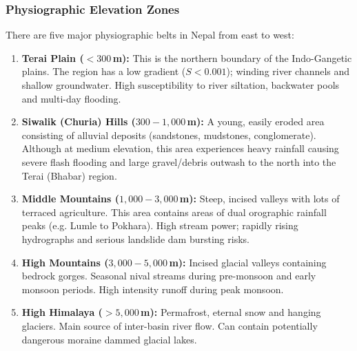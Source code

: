 \documentclass[journal]{IEEEtran}
\begin{document}
\subsubsection{Physiographic Elevation Zones}
There are five major physiographic belts in Nepal from east to west:
\begin{enumerate}
\item \textbf{Terai Plain ($<300$\,m):} This is the northern boundary of the Indo-Gangetic plains. The region has a low gradient ($S<0.001$); winding river channels and shallow groundwater. High susceptibility to river siltation, backwater pools and multi-day flooding.
\item \textbf{Siwalik (Churia) Hills ($300 - 1{,}000$\,m):} A young, easily eroded area consisting of alluvial deposits (sandstones, mudstones, conglomerate). Although at medium elevation, this area experiences heavy rainfall causing severe flash flooding and large gravel/debris outwash to the north into the Terai (Bhabar) region.
\item \textbf{Middle Mountains ($1{,}000 - 3{,}000$\,m):} Steep, incised valleys with lots of terraced agriculture. This area contains areas of dual orographic rainfall peaks (e.g. Lumle to Pokhara). High stream power; rapidly rising hydrographs and serious landslide dam bursting risks.
\item \textbf{High Mountains ($3{,}000 - 5{,}000$\,m):} Incised glacial valleys containing bedrock gorges. Seasonal nival streams during pre-monsoon and early monsoon periods. High intensity runoff during peak monsoon.
\item \textbf{High Himalaya ($>5{,}000$\,m):} Permafrost, eternal snow and hanging glaciers. Main source of inter-basin river flow. Can contain potentially dangerous moraine dammed glacial lakes.
\end{enumerate}
\end{document}
